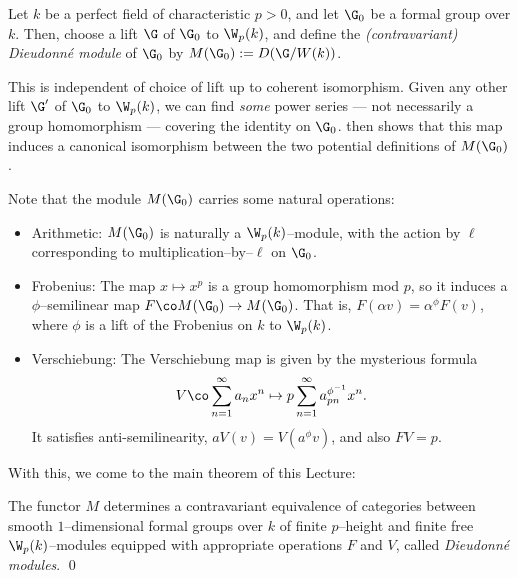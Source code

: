 \begin{definition}
Let $k$ be a perfect field of characteristic $p > 0$, and let $\G_0$ be a formal group over $k$.  Then, choose a lift $\G$ of $\G_0$ to $\W_p(k)$, and define the \textit{(contravariant) Dieudonn\'e module} of $\G_0$ by $M(\G_0) := D(\G / W(k))$.
\end{definition}

\begin{remark}
This is independent of choice of lift up to coherent isomorphism.  Given any other lift $\G'$ of $\G_0$ to $\W_p(k)$, we can find \emph{some} power series --- not necessarily a group homomorphism --- covering the identity on $\G_0$.   then shows that this map induces a canonical isomorphism between the two potential definitions of $M(\G_0)$.
\end{remark}

Note that the module $M(\G_0)$ carries some natural operations:
\begin{itemize}
\item Arithmetic: $M(\G_0)$ is naturally a $\W_p(k)$--module, with the action by $\ell$ corresponding to multiplication--by--$\ell$ on $\G_0$. 
\item Frobenius: The map $x \mapsto x^p$ is a group homomorphism mod $p$, so it induces a $\phi$--semilinear map $F\co M(\G_0) \to M(\G_0)$.  That is, $F(\alpha v) = \alpha^\phi F(v)$, where $\phi$ is a lift of the Frobenius on $k$ to $\W_p(k)$.
\item Verschiebung: The Verschiebung map is given by the mysterious formula \[V\co \sum_{n=1}^\infty a_n x^n \mapsto p \sum_{n=1}^\infty a_{pn}^{\phi^{-1}} x^n.\] It satisfies anti-semilinearity, $aV(v) = V(a^\phi v)$, and also $FV = p$.
\end{itemize}
With this, we come to the main theorem of this Lecture:

\begin{theorem}
The functor $M$ determines a contravariant equivalence of categories between smooth $1$--dimensional formal groups over $k$ of finite $p$--height and finite free $\W_p(k)$--modules equipped with appropriate operations $F$ and $V$, called \textit{Dieudonn\'e modules}. \qed {}
\end{theorem} 

